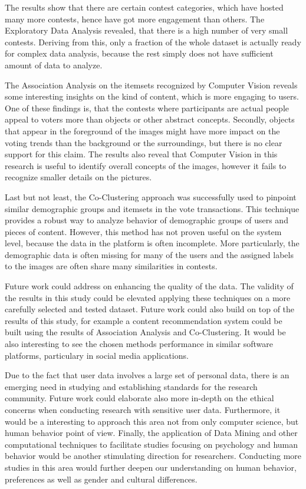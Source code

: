 The results show that there are certain contest categories, which have hosted many more contests, hence have got more engagement than others. The Exploratory Data Analysis revealed, that there is a high number of very small contests. Deriving from this, only a fraction of the whole dataset is actually ready for complex data analysis, because the rest simply does not have sufficient amount of data to analyze. 

The Association Analysis on the itemsets recognized by Computer Vision reveals some interesting insights on the kind of content, which is more engaging to users. One of these findings is, that the contests where participants are actual people appeal to voters more than objects or other abstract concepts. Secondly, objects that appear in the foreground of the images might have more impact on the voting trends than the background or the surroundings, but there is no clear support for this claim. The results also reveal that Computer Vision in this research is useful to identify overall concepts of the images, however it fails to recognize smaller details on the pictures. 

Last but not least, the Co-Clustering approach was successfully used to pinpoint similar demographic groups and itemsets in the vote transactions. This technique provides a robust way to analyze behavior of demographic groups of users and pieces of content. However, this method has not proven useful on the system level, because the data in the platform is often incomplete. More particularly, the demographic data is often missing for many of the users and the assigned labels to the images are often share many similarities in contests. 

Future work could address on enhancing the quality of the data. The validity of the results in this study could be elevated applying these techniques on a more carefully selected and tested dataset. Future work could also build on top of the results of this study, for example a content recommendation system could be built using the results of Association Analysis and Co-Clustering. It would be also interesting to see the chosen methods performance in similar software platforms, particulary in social media applications. 

Due to the fact that user data involves a large set of personal data, there is an emerging need in studying and establishing standards for the research community. Future work could elaborate also more in-depth on the ethical concerns when conducting research with sensitive user data. Furthermore, it would be a interesting to approach this area not from only computer science, but human behavior point of view. Finally, the application of Data Mining and other computational techniques to facilitate studies focusing on psychology and human behavior would be another stimulating direction for researchers. Conducting more studies in this area would further deepen our understanding on human behavior, preferences as well as gender and cultural differences. 